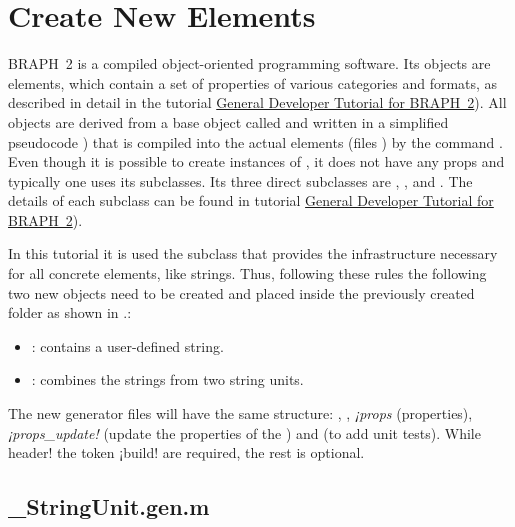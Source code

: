 \documentclass{tufte-handout}
\begin{document}
\section{Create New Elements}

BRAPH~2 is a compiled object-oriented programming software. Its
objects are elements, which contain a set of properties of various categories and formats, as described in detail in the tutorial \href{https://github.com/braph-software/BRAPH-2/tree/develop/tutorials/developers/dev_intro}{General Developer Tutorial for BRAPH~2}). All objects are derived from a base object called  and written in a simplified pseudocode ) that is compiled into the actual elements (files ) by the command .
Even though it is possible to create instances of , it does not have any props and typically one uses its subclasses. Its three direct subclasses are , , and . The details of each subclass can be found in tutorial \href{https://github.com/braph-software/BRAPH-2/tree/develop/tutorials/developers/dev_intro}{General Developer Tutorial for BRAPH~2}). 

In this tutorial it is used the subclass   that provides the infrastructure necessary for all concrete elements, like strings.
Thus, following these rules the following two new objects need to be created and placed inside the previously created folder  as shown in .:
\begin{itemize}
	\item {}: contains a user-defined string. 
	\item {}: combines the strings from two string units.
\end{itemize}

The new generator files will have the same structure:   , , \emph{¡props} (properties), \emph{ ¡props\_update!} (update the properties of the ) and  (to add unit tests). While header! the token ¡build! are required,
the rest is optional.

\subsection{\_StringUnit.gen.m}
\end{document}
